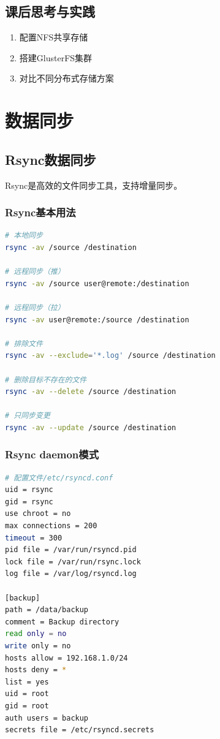 \documentclass[12pt,UTF8]{ctexbook}
\begin{document}
\section{课后思考与实践}
\label{sec:storage-services-practice}
\begin{enumerate}
    \item 配置NFS共享存储
    \item 搭建GlusterFS集群
    \item 对比不同分布式存储方案
\end{enumerate}

\chapter{数据同步}
\label{chap:data-sync}

\section{Rsync数据同步}
\label{sec:rsync}

Rsync是高效的文件同步工具，支持增量同步。

\subsection*{Rsync基本用法}
\begin{lstlisting}[language=bash]
# 本地同步
rsync -av /source /destination

# 远程同步（推）
rsync -av /source user@remote:/destination

# 远程同步（拉）
rsync -av user@remote:/source /destination

# 排除文件
rsync -av --exclude='*.log' /source /destination

# 删除目标不存在的文件
rsync -av --delete /source /destination

# 只同步变更
rsync -av --update /source /destination
\end{lstlisting}

\subsection*{Rsync daemon模式}
\begin{lstlisting}[language=bash]
# 配置文件/etc/rsyncd.conf
uid = rsync
gid = rsync
use chroot = no
max connections = 200
timeout = 300
pid file = /var/run/rsyncd.pid
lock file = /var/run/rsync.lock
log file = /var/log/rsyncd.log

[backup]
path = /data/backup
comment = Backup directory
read only = no
write only = no
hosts allow = 192.168.1.0/24
hosts deny = *
list = yes
uid = root
gid = root
auth users = backup
secrets file = /etc/rsyncd.secrets
\end{lstlisting}
\end{document}

